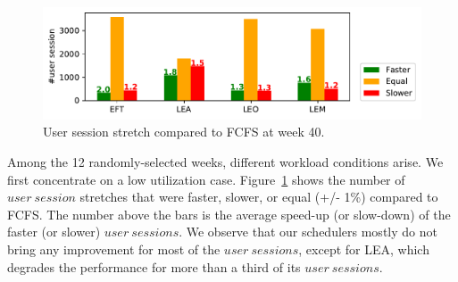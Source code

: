 \documentclass[conference]{IEEEtran}
\newcommand{\us}{\ensuremath{\mathit{user~session}}\xspace}
\newcommand{\uss}{\ensuremath{\mathit{user~sessions}}\xspace}
\begin{document}
\begin{figure}[t]\centering\includegraphics[width=1\linewidth]{../MBSS/plot/Boxplot/byuser/small_hist_stretch_10-03-10-09.pdf}\caption{User session stretch compared to FCFS at week 40.}\label{smallhist.40}\end{figure}

Among the 12 randomly-selected weeks, different workload conditions
arise. We first concentrate on a low utilization case.
Figure~\ref{smallhist.40} shows the number of \us stretches that were faster, slower, or equal (+/- 1\%) compared to FCFS.
The number above the bars is the average speed-up (or slow-down) of the faster (or slower) \uss.
We observe that our schedulers mostly do not bring any improvement for
most of the \uss, except for LEA, which degrades the performance for
more than a third of its \uss.

\end{document}
